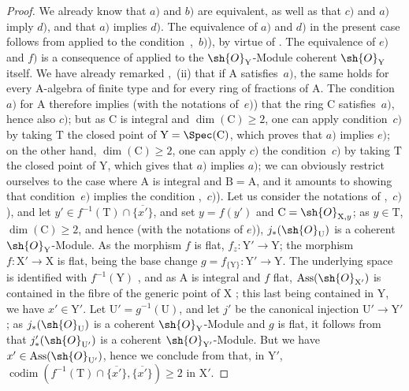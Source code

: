 \begin{proof}
We already know  that $a)$ and $b)$ are equivalent, as well as that $c)$ and $a)$ imply $d)$, and that $a)$
implies $d)$.
The equivalence of $a)$ and $d)$ in the present case follows from  applied to the condition~,~$b)$), by virtue of .
The equivalence of $e)$ and $f)$ is a consequence of  applied to the $\sh{O}_\mathrm{Y}$-Module coherent $\sh{O}_\mathrm{Y}$ itself.
We have already remarked ,~(ii) that if $\mathrm{A}$ satisfies~$a)$, the same holds for every A-algebra of finite type and for every ring of fractions of $\mathrm{A}$.
The condition~$a)$ for $\mathrm{A}$ therefore implies (with the notations of~$e)$) that the ring $\mathrm{C}$ satisfies~$a)$, hence also $c)$; but as $\mathrm{C}$ is integral and $\dim(\mathrm{C})\geqslant 2$, one can apply condition~$c)$ by taking $\mathrm{T}$ the closed point of $\mathrm{Y}=\Spec(\mathrm{C})$, which proves that $a)$ implies $e)$; on the other hand, $\dim(\mathrm{C})\geqslant 2$, one can apply $c)$ the condition~$c)$ by taking $\mathrm{T}$ the closed point of $\mathrm{Y}$, which gives that $a)$ implies $a)$;
we can obviously restrict ourselves to the case where $\mathrm{A}$ is integral and $\mathrm{B}=\mathrm{A}$, and it amounts to showing that condition~$e)$ implies the condition ,~$c)$).
Let us consider the notations of ,~$c)$), and let $y'\in f^{-1}(\mathrm{T})\cap\overline{\{x'\}}$, and set $y=f(y')$ and $\mathrm{C}=\sh{O}_{\mathrm{X},y}$; as $y\in\mathrm{T}$, $\dim(\mathrm{C})\geqslant 2$, and hence (with the notations of $e)$), $j_*(\sh{O}_\mathrm{U})$ is a coherent $\sh{O}_\mathrm{Y}$-Module.
As the morphism $f$ is flat, $f_z:\mathrm{Y}'\to\mathrm{Y}$; the morphism $f:\mathrm{X}'\to\mathrm{X}$ is flat, being the base change $g=f_{\{\mathrm{Y}\}}:\mathrm{Y}'\to\mathrm{Y}$.
The underlying space is identified with $f^{-1}(\mathrm{Y})$ , and as $\mathrm{A}$ is integral and $f$ flat, $\operatorname{Ass}(\sh{O}_{\mathrm{X}'})$ is contained in the fibre of the generic point of $\mathrm{X}$ ; this last being contained in $\mathrm{Y}$, we have $x'\in\mathrm{Y}'$.
Let $\mathrm{U}'=g^{-1}(\mathrm{U})$, and let $j'$ be the canonical injection $\mathrm{U}'\to\mathrm{Y}'$; as $j_*(\sh{O}_\mathrm{U})$ is a coherent $\sh{O}_\mathrm{Y}$-Module and $g$ is flat, it follows from  that $j'_*(\sh{O}_{\mathrm{U}'})$ is a coherent $\sh{O}_{\mathrm{Y}'}$-Module.
But we have $x'\in\operatorname{Ass}(\sh{O}_{\mathrm{U}'})$, hence we conclude from  that, in $\mathrm{Y}'$,
$\operatorname{codim}(f^{-1}(\mathrm{T})\cap\overline{\{x'\}},\overline{\{x'\}})\geqslant 2$ in $\mathrm{X}'$.
\end{proof}

